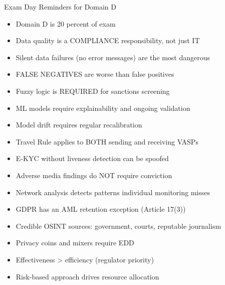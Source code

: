\documentclass[11pt,a4paper]{beamer}
\begin{document}
\begin{frame}{Exam Day Reminders for Domain D}
	\begin{itemize}
		\item Domain D is 20 percent of exam
		\item Data quality is a COMPLIANCE responsibility, not just IT
		\item Silent data failures (no error messages) are the most dangerous
		\item FALSE NEGATIVES are worse than false positives
		\item Fuzzy logic is REQUIRED for sanctions screening
		\item ML models require explainability and ongoing validation
		\item Model drift requires regular recalibration
		\item Travel Rule applies to BOTH sending and receiving VASPs
		\item E-KYC without liveness detection can be spoofed
		\item Adverse media findings do NOT require conviction
		\item Network analysis detects patterns individual monitoring misses
		\item GDPR has an AML retention exception (Article 17(3))
		\item Credible OSINT sources: government, courts, reputable journalism
		\item Privacy coins and mixers require EDD
		\item Effectiveness > efficiency (regulator priority)
		\item Risk-based approach drives resource allocation
	\end{itemize}
	\vspace{0.3cm}
\end{frame}
\end{document}
